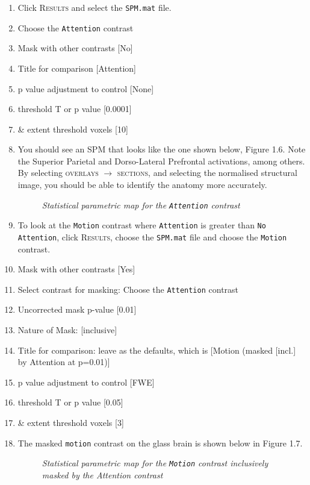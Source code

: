 \begin{enumerate}
\item Click \textsc{Results} and select the \texttt{SPM.mat} file.
\item Choose the \texttt{Attention} contrast
\item Mask with other contrasts [No]
\item Title for comparison [Attention]
\item p value adjustment to control [None]
\item threshold {T or p value} [0.0001]
\item \& extent threshold {voxels} [10]
\item You should see an SPM that looks like the one shown below, Figure 1.6. Note the Superior Parietal and Dorso-Lateral Prefrontal activations, among others. By selecting \textsc{overlays} $\rightarrow$ \textsc{sections}, and selecting the normalised structural image, you should be able to identify the anatomy more accurately.

\begin{figure}[!ht]
\centering{}
\caption{\em Statistical parametric map for the \texttt{Attention} contrast}
\label{ppi_fig6}
\end{figure}

\item To look at the \texttt{Motion} contrast where \texttt{Attention} is greater than \texttt{No Attention}, click \textsc{Results}, choose the \texttt{SPM.mat} file and choose the \texttt{Motion} contrast.
\item Mask with other contrasts [Yes]
\item Select contrast for masking: Choose the \texttt{Attention} contrast
\item Uncorrected mask p-value [0.01]
\item Nature of Mask: [inclusive]
\item Title for comparison: leave as the defaults, which is [Motion  (masked [incl.] by Attention at p=0.01)]
\item p value adjustment to control [FWE]
\item threshold {T or p value} [0.05]
\item \& extent threshold {voxels} [3]
\item The masked \texttt{motion} contrast on the glass brain is shown below in Figure 1.7.

\begin{figure}[!ht]
\centering{}
\caption{\em Statistical parametric map for the \texttt{Motion} contrast inclusively masked by the Attention contrast}
\label{ppi_fig7}
\end{figure}
\end{enumerate}

